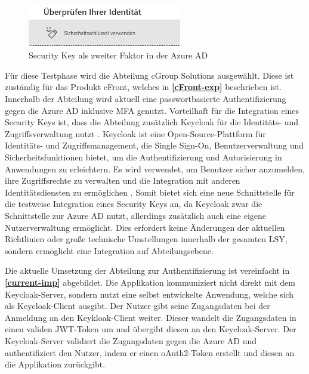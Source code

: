 \begin{figure}[h]
	\centering 
	\includegraphics[width=0.6\textwidth]{img/abbildungen/azure_seckey.png}
	\captionsetup{format=hang}
	\caption{Security Key als zweiter Faktor in der Azure \ac{AD}} \label{azure-seckey}
\end{figure}

Für diese Testphase wird die Abteilung cGroup Solutions ausgewählt. Diese ist zuständig für das Produkt cFront, welches in \textbf{\ref{cFront-exp}} beschrieben ist. Innerhalb der Abteilung wird aktuell eine passwortbasierte Authentifizierung gegen die Azure \ac{AD} inklusive \ac{MFA} genutzt. Vorteilhaft für die Integration eines Security Keys ist, dass die Abteilung zusätzlich Keycloak für die Identitäts- und Zugriffsverwaltung nutzt \cite{keycloak}. Keycloak ist eine Open-Source-Plattform für Identitäts- und Zugriffsmanagement, die Single Sign-On, Benutzerverwaltung und Sicherheitsfunktionen bietet, um die Authentifizierung und Autorisierung in Anwendungen zu erleichtern. Es wird verwendet, um Benutzer sicher anzumelden, ihre Zugriffsrechte zu verwalten und die Integration mit anderen Identitätsdiensten zu ermöglichen \cite{keycloak}. Somit bietet sich eine neue Schnittstelle für die testweise Integration eines Security Keys an, da Keycloak zwar die Schnittstelle zur Azure \ac{AD} nutzt, allerdings zusätzlich auch eine eigene Nutzerverwaltung ermöglicht. Dies erfordert keine Änderungen der aktuellen Richtlinien oder große technische Umstellungen innerhalb der gesamten \ac{LSY}, sondern ermöglicht eine Integration auf Abteilungsebene.

Die aktuelle Umsetzung der Abteilung zur Authentifizierung ist vereinfacht in \textbf{\ref{current-imp}} abgebildet. Die Applikation kommuniziert nicht direkt mit dem Keycloak-Server, sondern nutzt eine selbst entwickelte Anwendung, welche sich als Keycloak-Client ausgibt. Der Nutzer gibt seine Zugangsdaten bei der Anmeldung an den Keykloak-Client weiter. Dieser wandelt die Zugangsdaten in einen validen JWT-Token um und übergibt diesen an den Keycloak-Server. Der Keycloak-Server validiert die Zugangsdaten gegen die Azure \ac{AD} und authentifiziert den Nutzer, indem er einen oAuth2-Token erstellt und diesen an die Applikation zurückgibt.


